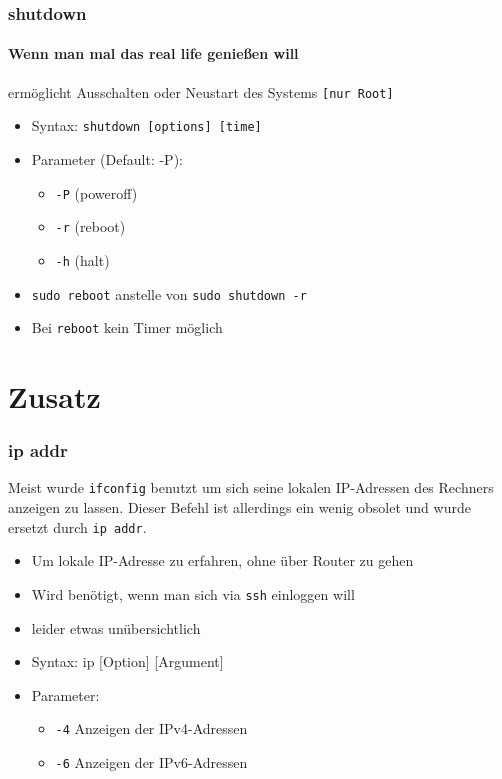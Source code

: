\documentclass[12pt,utf8, handout]{beamer}
\begin{document}
\begin{frame}
\frametitle{shutdown}
\framesubtitle{\textcolor{ownDarkOr}{Wenn man mal das real life genießen will}}
ermöglicht Ausschalten oder Neustart des Systems \texttt{[nur Root]}
\begin{itemize}[<+->]
	\item Syntax: \texttt{shutdown [options] [time]}
	\item Parameter (Default: -P):
	\begin{itemize}[<+->]
		\item \texttt{-P} (poweroff)
		\item \texttt{-r} (reboot) 
		\item \texttt{-h} (halt)
	\end{itemize}
	\item \texttt{sudo reboot} anstelle von \texttt{sudo shutdown -r}
	\item Bei \texttt{reboot} kein Timer möglich
\end{itemize}
\end{frame}

\section{Zusatz}
\begin{frame}
\frametitle{ip addr}
Meist wurde \texttt{ifconfig} benutzt um sich seine lokalen IP-Adressen des Rechners anzeigen zu lassen. Dieser Befehl ist allerdings ein wenig obsolet und wurde ersetzt durch \texttt{ip addr}.
\begin{itemize}
	\item Um lokale IP-Adresse zu erfahren, ohne über Router zu gehen
	\item Wird benötigt, wenn man sich via \texttt{ssh} einloggen will
	\item leider etwas unübersichtlich
	\item Syntax: ip [Option] [Argument]
	\item Parameter:
	\begin{itemize}
		\item \texttt{-4} Anzeigen der IPv4-Adressen
		\item \texttt{-6} Anzeigen der IPv6-Adressen
	\end{itemize}
\end{itemize}
\end{frame}
\end{document}
